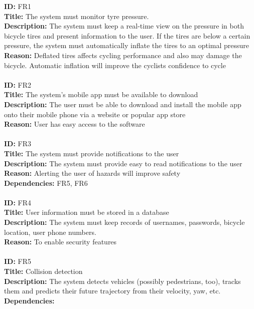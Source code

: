 \documentclass[a4paper]{report}
\begin{document}
\textbf{ID:} FR1\\
\textbf{Title:} The system must monitor tyre pressure.\\
\textbf{Description:} The system must keep a real-time view on the pressure in both bicycle tires and present information to the user. If the tires are below a certain pressure, the system must automatically inflate the tires to an optimal pressure\\
\textbf{Reason:} Deflated tires affects cycling performance and also may damage the bicycle. Automatic inflation will improve the cyclists confidence to cycle\\\\
\textbf{ID:} FR2\\
\textbf{Title:} The system's mobile app must be available to download\\
\textbf{Description:} The user must be able to download and install the mobile app onto their mobile phone via a website or popular app store\\
\textbf{Reason:} User has easy access to the software\\\\
\textbf{ID:}  FR3\\
\textbf{Title:}  The system must provide notifications to the user\\
\textbf{Description:} The system must provide easy to read notifications to the user\\
\textbf{Reason:} Alerting the user of hazards will improve safety\\
\textbf{Dependencies:} FR5, FR6\\\\
\textbf{ID:}  FR4\\
\textbf{Title:}  User information must be stored in a database\\
\textbf{Description:} The system must keep records of usernames, passwords, bicycle location, user phone numbers.\\
\textbf{Reason:} To enable security features\\\\
\textbf{ID:}  FR5\\
\textbf{Title:}  Collision detection\\
\textbf{Description:} The system detects vehicles (possibly pedestrians, too), tracks them and predicts their future trajectory from their velocity, yaw, etc. \\
\textbf{Dependencies:}\\\\
\end{document}
